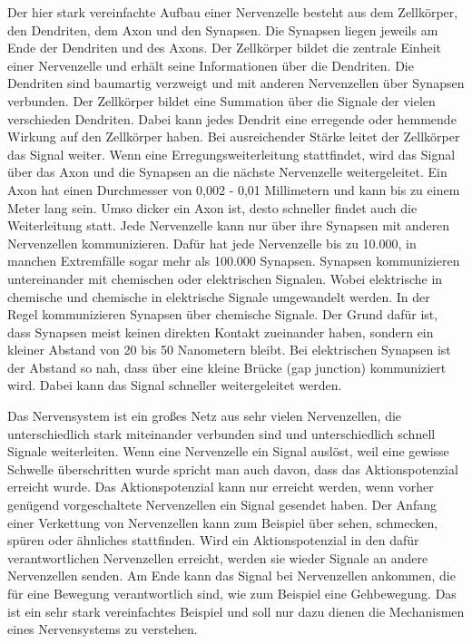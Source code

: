 Der hier stark vereinfachte Aufbau einer Nervenzelle besteht aus dem Zellkörper, den Dendriten, dem Axon und den Synapsen. Die Synapsen liegen jeweils am Ende der Dendriten und des Axons. Der Zellkörper bildet die zentrale Einheit einer Nervenzelle und erhält seine Informationen über die Dendriten. Die Dendriten sind baumartig verzweigt und mit anderen Nervenzellen über Synapsen verbunden. Der Zellkörper bildet eine Summation über die Signale der vielen verschieden Dendriten. Dabei kann jedes Dendrit eine erregende oder hemmende Wirkung auf den Zellkörper haben. Bei ausreichender Stärke leitet der Zellkörper das Signal weiter. Wenn eine Erregungsweiterleitung stattfindet, wird das Signal über das Axon und die Synapsen an die nächste Nervenzelle weitergeleitet. Ein Axon hat einen Durchmesser von 0,002 - 0,01 Millimetern und kann bis zu einem Meter lang sein.\cite{gehirnlernen.de} Umso dicker ein Axon ist, desto schneller findet auch die Weiterleitung statt. Jede Nervenzelle kann nur über ihre Synapsen mit anderen Nervenzellen kommunizieren. Dafür hat jede Nervenzelle bis zu 10.000, in manchen Extremfälle sogar mehr als 100.000 Synapsen.\cite{dasgehirn.info} Synapsen kommunizieren untereinander mit chemischen oder elektrischen Signalen. Wobei elektrische in chemische und chemische in elektrische Signale umgewandelt werden. In der Regel kommunizieren Synapsen über chemische Signale. Der Grund dafür ist, dass Synapsen meist keinen direkten Kontakt zueinander haben, sondern ein kleiner Abstand von 20 bis 50 Nanometern bleibt.\cite{dasgehirn.info} Bei elektrischen Synapsen ist der Abstand so nah, dass über eine kleine Brücke (gap junction) kommuniziert wird. Dabei kann das Signal schneller weitergeleitet werden.\cite{gehirnlernen.de}

Das Nervensystem ist ein großes Netz aus sehr vielen Nervenzellen, die unterschiedlich stark miteinander verbunden sind und unterschiedlich schnell Signale weiterleiten. Wenn eine Nervenzelle ein Signal auslöst, weil eine gewisse Schwelle überschritten wurde spricht man auch davon, dass das Aktionspotenzial erreicht wurde. Das Aktionspotenzial kann nur erreicht werden, wenn vorher genügend vorgeschaltete Nervenzellen ein Signal gesendet haben. Der Anfang einer Verkettung von Nervenzellen kann zum Beispiel über sehen, schmecken, spüren oder ähnliches stattfinden. Wird ein Aktionspotenzial in den dafür verantwortlichen Nervenzellen erreicht, werden sie wieder Signale an andere Nervenzellen senden. Am Ende kann das Signal bei Nervenzellen ankommen, die für eine Bewegung verantwortlich sind, wie zum Beispiel eine Gehbewegung. Das ist ein sehr stark vereinfachtes Beispiel und soll nur dazu dienen die Mechanismen eines Nervensystems zu verstehen.

